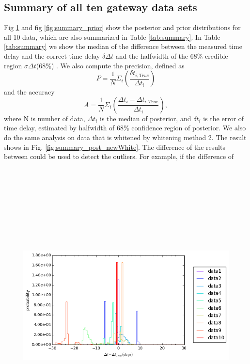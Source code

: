 \documentclass[\docopts]{\docclass}
\begin{document}
\subsection{Summary of all ten gateway data sets}
Fig \ref{fig:summary_post} and fig \ref{fig:summary_prior} show the posterior and prior distributions for all 10 data, which are also summarized in Table \ref{tab:summary}. In Table  \ref{tab:summary}  we show the median of the difference between the measured time delay and the correct time delay  $\delta \Delta t$ and the halfwidth of the $68\%$ credible region $\sigma\Delta t$($68\%$) .
 We also compute the precision, defined as 
\begin{equation}
P=\frac{1}{N} \Sigma_i (\frac{\delta t_{i, True}}{\Delta t_i})
\end{equation}
and the accuracy
\begin{equation}
A = \frac{1}{N} \Sigma_i (\frac{\Delta t_i-\Delta t_{i, True}}{\Delta t_i}),
\end{equation}
where N is number of data, $\Delta t_i$ is the median of posterior, and $\delta t_i$ is the error of time delay, estimated by halfwidth of $68\%$ confidence region of posterior. We also do the same analysis on data that is whitened by whitening method 2. The result shows in Fig. \ref{fig:summary_post_newWhite}. The difference of the results between could be used to detect the outliers. For example, if the difference of 
\begin{figure}[!h]
\includegraphics[width=\textwidth, height=15cm, keepaspectratio]{summary_posterior_summary.png}
\caption{}
\label{fig:summary_post}
\end{figure}
\end{document}
